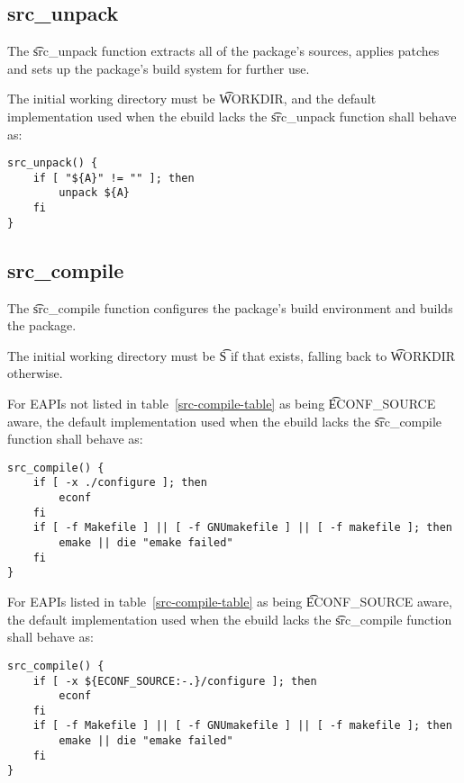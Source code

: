 \subsection{src\_unpack}
\label{src-unpack-function}

The \t{src\_unpack} function extracts all of the package's sources, applies patches and sets up the
package's build system for further use.

The initial working directory must be \t{WORKDIR}, and the default implementation used when
the ebuild lacks the \t{src\_unpack} function shall behave as:

\begin{lstlisting}
src_unpack() {
    if [ "${A}" != "" ]; then
        unpack ${A}
    fi
}
\end{lstlisting}

\subsection{src\_compile}
\label{src-compile-function}

The \t{src\_compile} function configures the package's build environment and builds the package.

The initial working directory must be \t{S} if that exists, falling back to \t{WORKDIR} otherwise.

For EAPIs not listed in table~\ref{src-compile-table} as being \t{ECONF\_SOURCE} aware, the default
implementation used when the ebuild lacks the \t{src\_compile} function shall behave as:

\begin{lstlisting}
src_compile() {
    if [ -x ./configure ]; then
        econf
    fi
    if [ -f Makefile ] || [ -f GNUmakefile ] || [ -f makefile ]; then
        emake || die "emake failed"
    fi
}
\end{lstlisting}

For EAPIs listed in table~\ref{src-compile-table} as being \t{ECONF\_SOURCE} aware, the default
implementation used when the ebuild lacks the \t{src\_compile} function shall behave as:

\begin{lstlisting}
src_compile() {
    if [ -x ${ECONF_SOURCE:-.}/configure ]; then
        econf
    fi
    if [ -f Makefile ] || [ -f GNUmakefile ] || [ -f makefile ]; then
        emake || die "emake failed"
    fi
}
\end{lstlisting}

